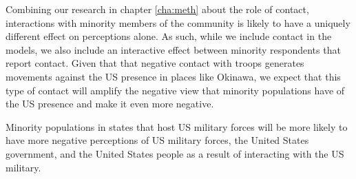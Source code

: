 
Combining our research in chapter \ref{cha:meth} about the role of contact, interactions with minority members of the community is likely to have a uniquely different effect on perceptions alone. As such, while we include contact in the models, we also include an interactive effect between minority respondents that report contact. Given that that negative contact with troops generates movements against the US presence in places like Okinawa, we expect that this type of contact will amplify the negative view that minority populations have of the US presence and make it even more negative.

\begin{hyp}
	Minority populations in states that host US military forces will be more likely to have more negative perceptions of US military forces, the United States government, and the United States people as a result of interacting with the US military. 
\end{hyp}























